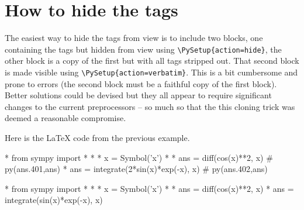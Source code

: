 \documentclass[12pt]{pylatex}
\begin{document}
\section*{How to hide the tags}
The easiest way to hide the tags from view is to include two blocks, one containing the tags but hidden from view using {\tt\small\verb|\PySetup{action=hide}|}, the other block is a copy of the first but with all tags stripped out. That second block is made visible using {\tt\small\verb|\PySetup{action=verbatim}|}. This is a bit cumbersome and prone to errors (the second block must be a faithful copy of the first block). Better solutions could be devised but they all appear to require significant changes to the current preprocessors -- so much so that the this cloning trick was deemed a reasonable compromise.

Here is the LaTeX code from the previous example.

\vspace{-5pt}

\begin{minipage}[t]{0.65\textwidth}
\latexstyle
{}
\latexstyle
{}
\pythonstyle
\begin{python}
*     from sympy import *
*
*     x = Symbol('x')
*
*     ans = diff(cos(x)**2, x)
*     ans = integrate(sin(x)*exp(-x), x)
\end{python}
\latexstyle
{}
\end{minipage}
\end{document}
